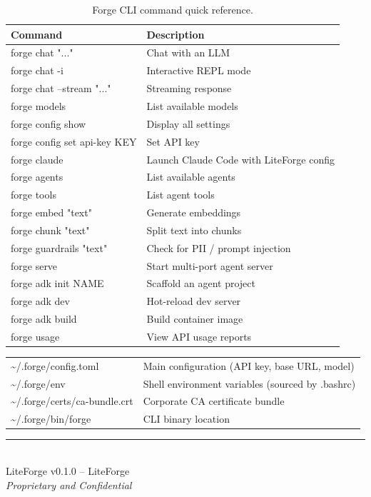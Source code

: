 \documentclass[11pt,letterpaper]{article}
\begin{document}
\begin{table}[H]
\centering
\renewcommand{\arraystretch}{1.3}
\begin{tabularx}{\textwidth}{@{}>{\ttfamily\small}l X@{}}
\toprule
\textnormal{\textbf{Command}} & \textbf{Description} \\
\midrule
forge chat "..." & Chat with an LLM \\
forge chat -i & Interactive REPL mode \\
forge chat --stream "..." & Streaming response \\
forge models & List available models \\
forge config show & Display all settings \\
forge config set api-key KEY & Set API key \\
forge claude & Launch Claude Code with LiteForge config \\
forge agents & List available agents \\
forge tools & List agent tools \\
forge embed "text" & Generate embeddings \\
forge chunk "text" & Split text into chunks \\
forge guardrails "text" & Check for PII / prompt injection \\
forge serve & Start multi-port agent server \\
forge adk init NAME & Scaffold an agent project \\
forge adk dev & Hot-reload dev server \\
forge adk build & Build container image \\
forge usage & View API usage reports \\
\bottomrule
\end{tabularx}
\caption{Forge CLI command quick reference.}
\end{table}

\begin{tcolorbox}[infobox={Configuration Locations}]
\begin{tabularx}{\textwidth}{@{}>{\ttfamily\small}l X@{}}
\textasciitilde/.forge/config.toml & Main configuration (API key, base URL, model) \\
\textasciitilde/.forge/env & Shell environment variables (sourced by .bashrc) \\
\textasciitilde/.forge/certs/ca-bundle.crt & Corporate CA certificate bundle \\
\textasciitilde/.forge/bin/forge & CLI binary location \\
\end{tabularx}
\end{tcolorbox}

\vfill

\begin{center}
\small\color{forgegray}
\rule{0.6\textwidth}{0.4pt}\\[6pt]
LiteForge v0.1.0 -- LiteForge\\
\textcolor{alertred}{\textit{Proprietary and Confidential}}
\end{center}
\end{document}
